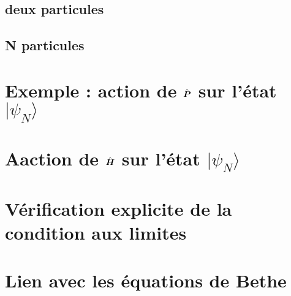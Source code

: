 \section{deux particules}\label{annex:2.part}

\section{N particules}\label{annex:N.part}


\chapter{Exemple : action de $\hat{\bm{P}}$ sur l’état $\vert \psi_N\rangle$}


\chapter{Aaction de $\hat{\bm{H}}$ sur l’état $\vert \psi_N\rangle$}


\chapter{Vérification explicite de la condition aux limites}

\chapter{Lien avec les équations de Bethe}



\newpage
\printindex
\printindex[pers]
			            
